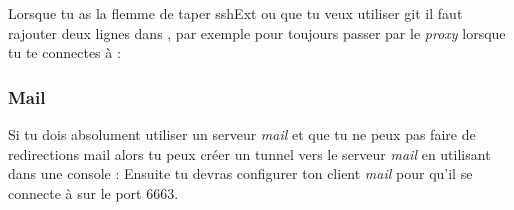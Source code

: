 Lorsque tu as la flemme de taper sshExt ou que tu veux utiliser git il faut rajouter deux lignes dans , par exemple pour toujours passer par le \emph{proxy} lorsque tu te connectes à  :

\subsubsection{Mail}

Si tu dois absolument utiliser un serveur \emph{mail} et que tu ne peux pas faire de redirections mail alors tu peux créer un tunnel vers le serveur \emph{mail} en utilisant dans une console :
Ensuite tu devras configurer ton client \emph{mail} pour qu'il se connecte à  sur le port 6663.
